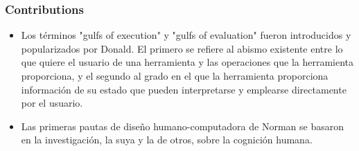 \documentclass[11pt]{beamer}
\begin{document}
\begin{frame}
\frametitle{Contributions}
\begin{itemize}
\item Los términos "gulfs of execution" y "gulfs of evaluation" fueron introducidos y popularizados por Donald. El primero se refiere al abismo existente entre lo que quiere el usuario de una herramienta y las operaciones que la herramienta proporciona, y el segundo al grado en el que la herramienta proporciona información de su estado que pueden interpretarse y emplearse directamente por el usuario.
\item Las primeras pautas de diseño humano-computadora de Norman se basaron en la investigación, la suya y la de otros, sobre la cognición humana.

\end{itemize}
\end{frame}
\end{document}
